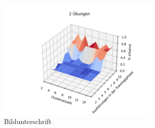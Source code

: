 \documentclass{article}
\begin{document}
\begin{figure}[h]
\centering
\label{fig:neuron}
\includegraphics[width=0.7\textwidth]{figures/5_graph.png}
\caption{Bildunterschrift}
\end{figure}
\end{document}
